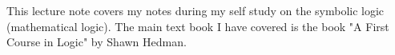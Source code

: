 \documentclass[11pt]{article}
\begin{document}

This lecture note covers my notes during my self study on the symbolic logic (mathematical logic). The main text book I have covered is the book "A First Course in Logic" by Shawn Hedman.


\newpage

\newpage

\end{document}
